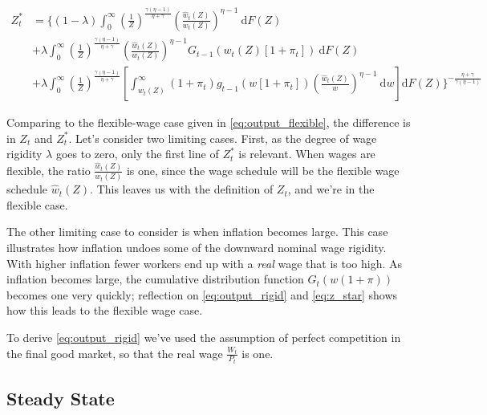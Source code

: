 \documentclass[12pt,a4paper]{scrartcl}            %
\begin{document}
\begin{equation}
    \label{eq:z_star}
    \begin{split}
    Z_t^* &= \Big\{(1 - \lambda) \int_{0}^{\infty} \! \left( \frac{1}{Z} \right)^{\frac{\gamma(\eta - 1)}{\eta + \gamma}} \left( \frac{\hat{w}_t(Z)}{w_t(Z)} \right)^{\eta - 1}\ \mathrm{d}F(Z) \\
          &+            \lambda  \int_{0}^{\infty} \! \left( \frac{1}{Z} \right)^{\frac{\gamma(\eta - 1)}{\eta + \gamma}} \left( \frac{\hat{w}_t(Z)}{w_t(Z)} \right)^{\eta - 1} G_{t-1}\left( w_t(Z)[1 + \pi_t] \right)                                                     \ \mathrm{d}F(Z)\\
          &+            \lambda  \int_{0}^{\infty} \! \left( \frac{1}{Z} \right)^{\frac{\gamma(\eta - 1)}{\eta + \gamma}} \left[ \int_{w_t(Z)}^{\infty} (1 + \pi_t)g_{t-1}\left( w[1 + \pi_t] \right) \left( \frac{\hat{w}_t(Z)}{w} \right)^{\eta - 1}\ \mathrm{d}w \right] \mathrm{d}F(Z)
            \Big\}^{-\frac{\eta + \gamma}{\gamma(\eta - 1)}}
    \end{split}
\end{equation}

Comparing to the flexible-wage case given in \eqref{eq:output_flexible}, the difference is in $Z_t$ and $Z_t^*$.
Let's consider two limiting cases.
First, as the degree of wage rigidity $\lambda$ goes to zero, only the first line of $Z_t^*$ is relevant.
When wages are flexible, the ratio $\frac{\hat{w}_t(Z)}{w_t(Z)}$ is one, since the wage schedule will be the flexible wage schedule $\hat{w}_t(Z)$.  %
This leaves us with the definition of $Z_t$, and we're in the flexible case.

The other limiting case to consider is when inflation becomes large.
This case illustrates how inflation undoes some of the downward nominal wage rigidity.
With higher inflation fewer workers end up with a \emph{real} wage that is too high.
As inflation becomes large, the cumulative distribution function $G_t(w (1 + \pi))$ becomes one very quickly;
reflection on \eqref{eq:output_rigid} and \eqref{eq:z_star} shows how this leads to the flexible wage case.

To derive \eqref{eq:output_rigid} we've used the assumption of perfect competition in the final good market, so that the real wage $\frac{W_t}{P_t}$ is one.

\subsection{Steady State}
\label{sub:steady_state}
\end{document}
